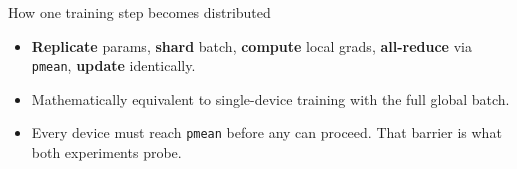 \documentclass[aspectratio=169,10pt]{beamer}
\begin{document}
\begin{frame}{How one training step becomes distributed}
\begin{center}
{}%
  \end{center}

  \vspace{-0.4em}
  {\raggedright\begin{itemize}[<+->]\small
    \item \textbf{Replicate} params, \textbf{shard} batch, \textbf{compute} local grads,
          \textbf{all-reduce} via \texttt{pmean}, \textbf{update} identically.
    \item Mathematically equivalent to single-device training with the full global batch.
    \item \alert{Every device must reach \texttt{pmean} before any can proceed.}
          That barrier is what both experiments probe.
  \end{itemize}\par}
\end{frame}
\end{document}
